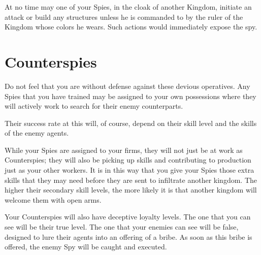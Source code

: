 At no time may one of your Spies, in the cloak of another Kingdom, initiate an attack or build any structures unless he is commanded to by the ruler of the Kingdom whose colors he wears. Such actions would immediately expose the spy.

\section{Counterspies}


Do not feel that you are without defense against these devious operatives. Any Spies that you have trained may be assigned to your own possessions where they will actively work to search for their enemy counterparts.

Their success rate at this will, of course, depend on their skill level and the skills of the enemy agents.

While your Spies are assigned to your firms, they will not just be at work as Counterspies; they will also be picking up skills and contributing to production just as your other workers. It is in this way that you give your Spies those extra skills that they may need before they are sent to infiltrate another kingdom. The higher their secondary skill levels, the more likely it is that another kingdom will welcome them with open arms.

Your Counterspies will also have deceptive loyalty levels. The one that you can see will be their true level. The one that your enemies can see will be false, designed to lure their agents into an offering of a bribe. As soon as this bribe is offered, the enemy Spy will be caught and executed.